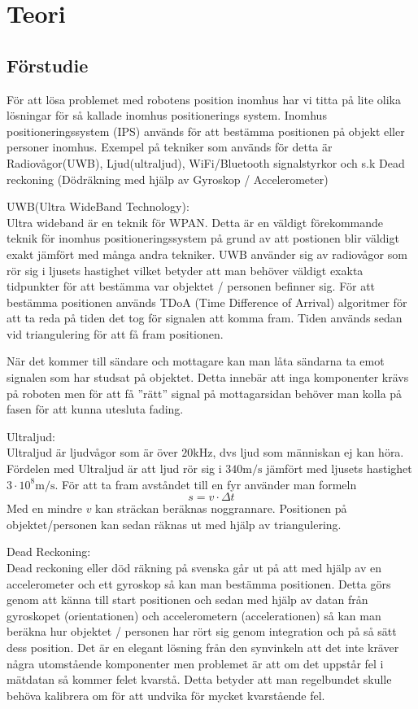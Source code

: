\documentclass[11pt, a4paper]{report}
\begin{document}
\chapter{Teori}

\section{Förstudie}

För att lösa problemet med robotens position inomhus har vi titta på lite olika lösningar för så kallade inomhus positionerings system. Inomhus positioneringssystem (IPS) används för att bestämma positionen på objekt eller personer inomhus. Exempel på  tekniker som används för detta är Radiovågor(UWB), Ljud(ultraljud), WiFi/Bluetooth signalstyrkor och s.k Dead reckoning (Dödräkning med hjälp av Gyroskop / Accelerometer)


UWB(Ultra WideBand Technology): \\
Ultra wideband är en teknik för WPAN. Detta är en väldigt förekommande teknik för inomhus positioneringssystem på grund av att postionen blir väldigt exakt jämfört med många andra tekniker. UWB använder sig av radiovågor som rör sig i ljusets hastighet vilket betyder att man behöver väldigt exakta tidpunkter för att bestämma var objektet / personen befinner sig. För att bestämma positionen används TDoA (Time Difference of Arrival) algoritmer för att ta reda på tiden det tog för signalen att komma fram. Tiden används sedan vid triangulering för att få fram positionen.

När det kommer till sändare och mottagare kan man låta sändarna ta emot signalen som har studsat på objektet. Detta innebär att inga komponenter krävs på roboten men för att få ''rätt'' signal på mottagarsidan behöver man kolla på fasen för att kunna utesluta fading.

Ultraljud: \\
Ultraljud är ljudvågor som är över $20\textrm{kHz}$, dvs ljud som människan ej kan höra. Fördelen med Ultraljud är att ljud rör sig i $340\textrm{m/s}$ jämfört med ljusets hastighet $3 \cdot 10^{8}\textrm{m/s}$. För att ta fram avståndet till en fyr använder man formeln
\begin{equation}
s = v \cdot \Delta t
\end{equation}
Med en mindre $v$ kan sträckan beräknas noggrannare. Positionen på objektet/personen kan sedan räknas ut med hjälp av triangulering.

Dead Reckoning:\\
Dead reckoning eller död räkning på svenska går ut på att med hjälp av en accelerometer och ett gyroskop så kan man bestämma positionen. Detta görs genom att känna till start positionen och sedan med hjälp av datan från gyroskopet (orientationen) och accelerometern (accelerationen) så kan man beräkna hur objektet / personen har rört sig genom integration och  på så sätt dess position. Det är en elegant lösning från den synvinkeln att det inte kräver några utomstående komponenter men problemet är att om det uppstår fel i mätdatan så kommer felet kvarstå. Detta betyder att man regelbundet skulle behöva kalibrera om för att undvika för mycket kvarstående fel.
\end{document}
